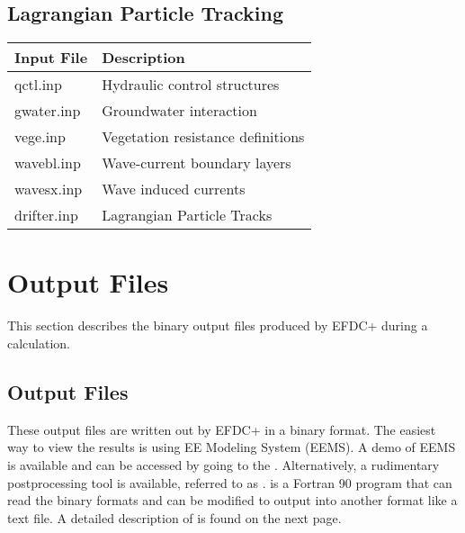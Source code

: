 \documentclass[letterpaper,10pt,english]{sphinxmanual}
\begin{document}
\subsection{Lagrangian Particle Tracking}
\label{\detokenize{inputfiles/lagrangian:lagrangian-particle-tracking}}\label{\detokenize{inputfiles/lagrangian:lagrangian}}\label{\detokenize{inputfiles/lagrangian::doc}}

\begin{savenotes}\sphinxattablestart
\centering
\begin{tabulary}{\linewidth}[t]{|T|T|}
\hline
\sphinxstyletheadfamily 
Input File
&\sphinxstyletheadfamily 
Description
\\
\hline
qctl.inp
&
Hydraulic control structures
\\
\hline
gwater.inp
&
Groundwater interaction
\\
\hline
vege.inp
&
Vegetation resistance definitions
\\
\hline
wavebl.inp
&
Wave-current boundary layers
\\
\hline
wavesx.inp
&
Wave induced currents
\\
\hline
drifter.inp
&
Lagrangian Particle Tracks
\\
\hline
\end{tabulary}
\par
\sphinxattableend\end{savenotes}


\section{Output Files}
\label{\detokenize{outputfiles/index:output-files}}\label{\detokenize{outputfiles/index:index}}\label{\detokenize{outputfiles/index::doc}}
This section describes the binary output files produced by EFDC+ during a calculation.


\subsection{Output Files}
\label{\detokenize{outputfiles/output:output-files}}\label{\detokenize{outputfiles/output:output}}\label{\detokenize{outputfiles/output::doc}}
These output files are written out by EFDC+ in a binary format. The easiest way to view the results is using EE Modeling System (EEMS).  A demo of EEMS is available and can be accessed by going to the .  Alternatively, a rudimentary postprocessing tool is available, referred to as .   is a Fortran 90 program that can read the binary formats and can be modified to output into another format like a text file.  A detailed description of  is found on the next page.
\end{document}
